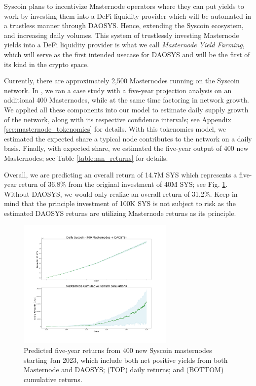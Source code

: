 \documentclass[journal,twocolumn,12pt]{ieeesyscoin}
\begin{document}
Syscoin plans to incentivize Masternode operators where they can put yields to work by investing them into a DeFi liquidity provider which will be automated in a trustless manner through DAOSYS. Hence, extending the Syscoin ecosystem, and increasing daily volumes. This system of trustlessly investing Masternode yields into a DeFi liquidity provider is what we call \textit{Masternode Yield Farming}, which will serve as the first intended usecase for DAOSYS and will be the first of its kind in the crypto space.

Currently, there are approximately 2,500 Masternodes running on the Syscoin network. In \cite{Moo22A}, we ran a case study with a five-year projection analysis on an additional 400 Masternodes, while at the same time factoring in network growth. We applied all these components into our model to estimate daily supply growth of the network, along with its respective confidence intervals; see Appendix \ref{sec:masternode_tokenomics} for details. With this tokenomics model, we estimated the expected share a typical node contributes to the network on a daily basis. Finally, with expected share, we estimated the five-year output of 400 new Masternodes; see Table \ref{table:mn_returns} for details.

Overall, we are predicting an overall return of 14.7M SYS which represents a five-year return of 36.8\% from the original investment of 40M SYS; see Fig. \ref{fig:reward_output}. Without DAOSYS, we would only realize an overall return of 31.2\%. Keep in mind that the principle investment of 100K SYS is not subject to risk as the estimated DAOSYS returns are utilizing Masternode returns as its principle. 

\begin{figure}[h!]
\includegraphics[width=3in]{img/supply_tot_reward_output.png}
\caption{Predicted five-year returns from 400 new Syscoin masternodes starting Jan 2023, which include both net positive yields from both Masternode and DAOSYS; (TOP) daily returns; and (BOTTOM) cumulative returns.} 
\label{fig:reward_output}
\end{figure} 
\end{document}
